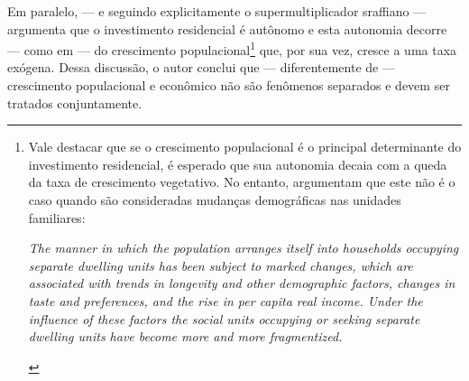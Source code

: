 Em paralelo, --- e seguindo explicitamente o supermultiplicador sraffiano --- \textcite{gowans_introducing_2014} argumenta que o investimento residencial é autônomo e esta autonomia decorre --- como em \textcite{hansen_economic_1939} --- do crescimento populacional\footnote{
	Vale destacar que se o crescimento populacional é o principal determinante do investimento residencial, é esperado que sua autonomia decaia com a queda da taxa de crescimento vegetativo.
	No entanto,  \textcite[p.~11]{grebler_capital_1956} argumentam que este não é o caso quando são consideradas mudanças demográficas nas unidades familiares:
	
	\begin{citacao}
		\textit{The manner in which the population arranges itself into households
			occupying separate dwelling units has been subject to marked changes,
			which are associated with trends in longevity and other demographic
			factors, changes in taste and preferences, and the rise in per capita real
			income. Under the influence of these factors the social units occupying
			or seeking separate dwelling units have become more and more fragmentized.}
	\end{citacao}
} que, por sua vez, cresce a uma taxa exógena.
Dessa discussão, o autor conclui que --- diferentemente de \textcite{robinson_model_1962} --- crescimento populacional e econômico não são fenômenos separados e devem ser tratados conjuntamente.


